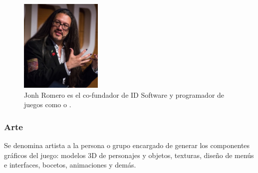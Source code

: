 \begin{figure}[h]
    \centering
    \includegraphics[width=0.35\textwidth]{images/estadodelarte/desarrollo/john-romero}
    \caption{Jonh Romero es el co-fundador de ID Software y programador de juegos como  o .}
\end{figure}

\subsubsection{Arte}
Se denomina artista a la persona o grupo encargado de generar los componentes gráficos del juego: modelos 3D de personajes y objetos, texturas, diseño de menús e interfaces, bocetos, animaciones y demás.

